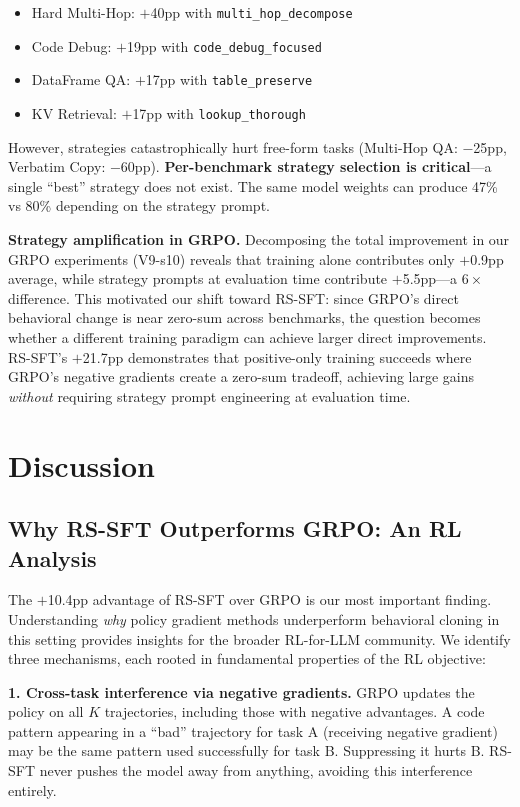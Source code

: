\documentclass{article}
\begin{document}
\begin{itemize}
    \item Hard Multi-Hop: $+$40pp with \texttt{multi\_hop\_decompose}
    \item Code Debug: $+$19pp with \texttt{code\_debug\_focused}
    \item DataFrame QA: $+$17pp with \texttt{table\_preserve}
    \item KV Retrieval: $+$17pp with \texttt{lookup\_thorough}
\end{itemize}

However, strategies catastrophically hurt free-form tasks (Multi-Hop QA: $-$25pp, Verbatim Copy: $-$60pp). \textbf{Per-benchmark strategy selection is critical}---a single ``best'' strategy does not exist. The same model weights can produce 47\% vs 80\% depending on the strategy prompt.

\textbf{Strategy amplification in GRPO.} Decomposing the total improvement in our GRPO experiments (V9-s10) reveals that training alone contributes only $+$0.9pp average, while strategy prompts at evaluation time contribute $+$5.5pp---a $6{\times}$ difference. This motivated our shift toward RS-SFT: since GRPO's direct behavioral change is near zero-sum across benchmarks, the question becomes whether a different training paradigm can achieve larger direct improvements. RS-SFT's $+$21.7pp demonstrates that positive-only training succeeds where GRPO's negative gradients create a zero-sum tradeoff, achieving large gains \emph{without} requiring strategy prompt engineering at evaluation time.

\section{Discussion}
\label{sec:discussion}

\subsection{Why RS-SFT Outperforms GRPO: An RL Analysis}
\label{sec:why-rs-sft}

The $+$10.4pp advantage of RS-SFT over GRPO is our most important finding. Understanding \emph{why} policy gradient methods underperform behavioral cloning in this setting provides insights for the broader RL-for-LLM community. We identify three mechanisms, each rooted in fundamental properties of the RL objective:

\textbf{1. Cross-task interference via negative gradients.} GRPO updates the policy on all $K$ trajectories, including those with negative advantages. A code pattern appearing in a ``bad'' trajectory for task A (receiving negative gradient) may be the same pattern used successfully for task B. Suppressing it hurts B. RS-SFT never pushes the model away from anything, avoiding this interference entirely.
\end{document}
